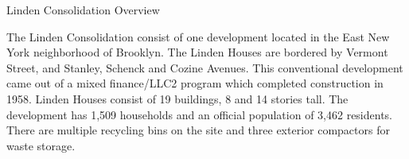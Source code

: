 Linden Consolidation Overview

The Linden Consolidation consist of one development located in the East New York neighborhood of Brooklyn. The Linden Houses are bordered by Vermont Street, and Stanley, Schenck and Cozine Avenues. This conventional development came out of a mixed finance/LLC2 program which completed construction in 1958. Linden Houses consist of 19 buildings, 8 and 14 stories tall. The development has 1,509 households and an official population of 3,462 residents. There are multiple recycling bins on the site and three exterior compactors for waste storage.